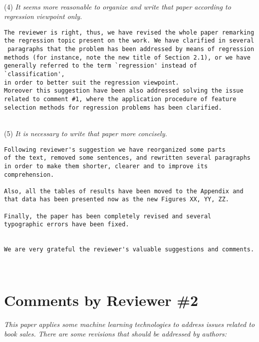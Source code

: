 \documentclass[preprint]{elsarticle}
\begin{document}
~\\
\noindent (4) \emph{It seems more reasonable to organize and write that paper according to regression viewpoint only. } 

\begin{verbatim}
The reviewer is right, thus, we have revised the whole paper remarking 
the regression topic present on the work. We have clarified in several
 paragraphs that the problem has been addressed by means of regression 
methods (for instance, note the new title of Section 2.1), or we have 
generally referred to the term `regression' instead of `classification', 
in order to better suit the regression viewpoint.
Moreover this suggestion have been also addressed solving the issue 
related to comment #1, where the application procedure of feature 
selection methods for regression problems has been clarified. 
\end{verbatim}


~\\
\noindent (5) \emph{It is necessary to write that paper more concisely. } 

\begin{verbatim}
Following reviewer's suggestion we have reorganized some parts 
of the text, removed some sentences, and rewritten several paragraphs 
in order to make them shorter, clearer and to improve its comprehension. 

Also, all the tables of results have been moved to the Appendix and 
that data has been presented now as the new Figures XX, YY, ZZ.

Finally, the paper has been completely revised and several 
typographic errors have been fixed. 


We are very grateful the reviewer's valuable suggestions and comments. 
\end{verbatim}


~\\

\section{Comments by Reviewer \#2}

\noindent \emph{This paper applies some machine learning technologies to address issues related to book sales. There are some revisions that should be addressed by authors: } \\
\end{document}

